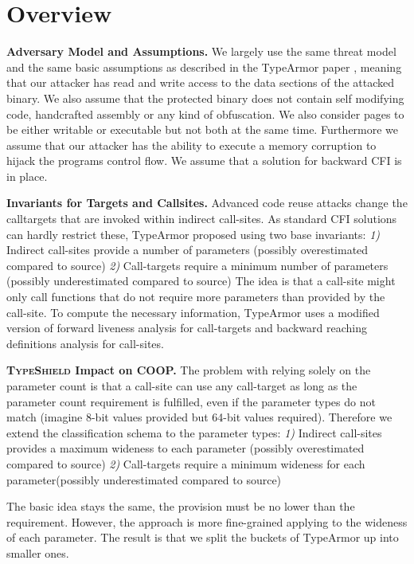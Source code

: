 \section{Overview}
\label{chapter:TypeShild Overview}

\textbf{Adversary Model and Assumptions.}
\label{Adversary Model}
We largely use the same threat model and the same basic assumptions as described in the TypeArmor 
paper \cite{veen:typearmor}, meaning that our attacker has read and write access to the data 
sections of the attacked binary.  We also assume that the protected binary does not contain 
self modifying code, handcrafted assembly or any kind of obfuscation. We also consider pages 
to be either writable or executable but not both at the same time. Furthermore we assume 
that our attacker has the ability to execute a memory corruption to hijack the programs 
control flow. We assume that a solution for backward CFI is in place.

\textbf{Invariants for Targets and Callsites.}
\label{Invariants for Targets and Callsites}
Advanced code reuse attacks change the calltargets that are invoked within indirect 
call-sites. As standard CFI solutions can hardly restrict these, TypeArmor proposed using two base invariants:
\textit{1)} Indirect call-sites provide a number of parameters (possibly overestimated compared to source)
\textit{2)} Call-targets require a minimum number of parameters (possibly underestimated compared to source)
The idea is that a call-site might only call functions that do not require more parameters than provided by the call-site. 
To compute the necessary information, TypeArmor uses a modified version of forward liveness analysis for call-targets and 
backward reaching definitions analysis for call-sites.

\textbf{\textsc{TypeShield} Impact on COOP.}
\label{TypeShild Impact on COOP}
The problem with relying solely on the parameter count is that a call-site can use any call-target as long as the parameter count 
requirement is fulfilled, even if the parameter types do not match (imagine 8-bit values provided but 64-bit values required). 
Therefore we extend the classification schema to the parameter types:
\textit{1)} Indirect call-sites provides a maximum wideness to each parameter (possibly overestimated compared to source)
\textit{2)} Call-targets require a minimum wideness for each parameter(possibly underestimated compared to source)

The basic idea stays the same, the provision must be no lower than the requirement. However, the approach is more fine-grained 
applying to the wideness of each parameter. The result is that we split the buckets of TypeArmor up into smaller ones.
